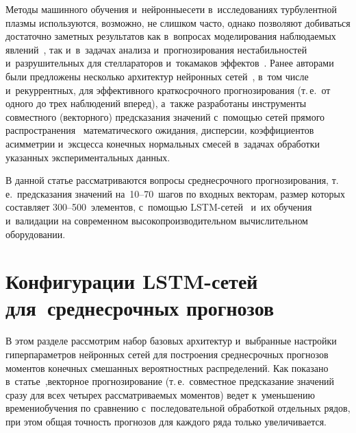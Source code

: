 \begin{multicols}{2}
Методы машинного обучения и~нейронные\linebreak сети в~исследованиях турбулентной 
плазмы используются, возможно, не слишком часто, однако позволяют 
добиваться достаточно заметных результатов как в~вопросах моделирования 
наблюдаемых явлений~\cite{Meneghini2014,Raja2018,Mesbah2019,Narita2019},
 так и~в~задачах анализа и~прогнозирования нестабильностей и~разрушительных
  для стеллараторов и~токамаков эффектов~\cite{Parsons2017,Kates-Harbeck2019}.\linebreak
Ранее авторами были предложены несколько архитектур нейронных 
сетей~\cite{Gorshenin2019b,Gorshenin2019c}, в~том числе и~рекуррентных, 
для эффективного краткосрочного прогнозирования (т.\,е.\ 
от одного до трех наблюдений вперед), а~также разработаны инструменты 
совместного (векторного) предсказания значений с~помощью сетей прямого 
распространения~\cite{Gorshenin2020} математического ожидания, дисперсии, 
коэффициентов асимметрии и~эксцесса конечных нормальных смесей в~задачах 
обработки указанных экспериментальных данных.

В данной статье рассматриваются вопросы среднесрочного прогнозирования, 
т.\,е.\ предсказания значений на~10--70~шагов по входных векторам, размер 
которых составляет 300--500~элементов, с~помощью LSTM-се\-тей~\cite{Greff2017} 
и~их обучения и~валидации на современном высокопроизводительном 
вы\-чис\-ли\-тель\-ном оборудовании.

\section{Конфигурации LSTM-сетей для~среднесрочных прогнозов}

В этом разделе рассмотрим набор базовых архитектур и~выбранные 
настройки гиперпараметров нейронных сетей для построения среднесрочных 
прогнозов моментов конечных смешанных вероятностных распределений. 
Как показано в~статье~\cite{Gorshenin2020},\linebreak векторное прогнозирование 
(т.\,е.\ совместное предсказание значений сразу для всех
четырех рас\-смат\-ри\-ва\-емых 
моментов) ведет к~уменьшению времени\linebreak обучения по сравнению с~последовательной 
обработкой отдельных рядов, при этом общая точность прогнозов для каждого 
ряда только увеличивается.
{ %

}


\end{multicols}
